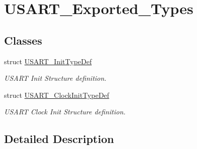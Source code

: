 \hypertarget{group___u_s_a_r_t___exported___types}{}\section{U\+S\+A\+R\+T\+\_\+\+Exported\+\_\+\+Types}
\label{group___u_s_a_r_t___exported___types}
\subsection*{Classes}
\begin{DoxyCompactItemize}
\item 
struct \hyperlink{struct_u_s_a_r_t___init_type_def}{U\+S\+A\+R\+T\+\_\+\+Init\+Type\+Def}
\begin{DoxyCompactList}\small\item\em U\+S\+A\+RT Init Structure definition. \end{DoxyCompactList}\item 
struct \hyperlink{struct_u_s_a_r_t___clock_init_type_def}{U\+S\+A\+R\+T\+\_\+\+Clock\+Init\+Type\+Def}
\begin{DoxyCompactList}\small\item\em U\+S\+A\+RT Clock Init Structure definition. \end{DoxyCompactList}\end{DoxyCompactItemize}


\subsection{Detailed Description}
